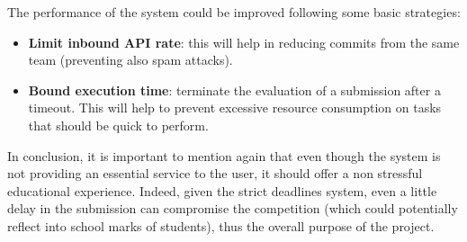 The performance of the system could be improved following some basic strategies:
\begin{itemize}
    \item \textbf{Limit inbound API rate}: this will help in reducing commits from the same team (preventing also spam attacks).
    \item \textbf{Bound execution time}: terminate the evaluation of a submission after a timeout. This will help to prevent excessive resource consumption on tasks that should be quick to perform. 
\end{itemize}
In conclusion, it is important to mention again that even though the system is not providing an essential service to the user, it should offer a non stressful educational experience. Indeed, given the strict deadlines system, even a little delay in the submission can compromise the competition (which could potentially reflect into school marks of students), thus the overall purpose of the project.